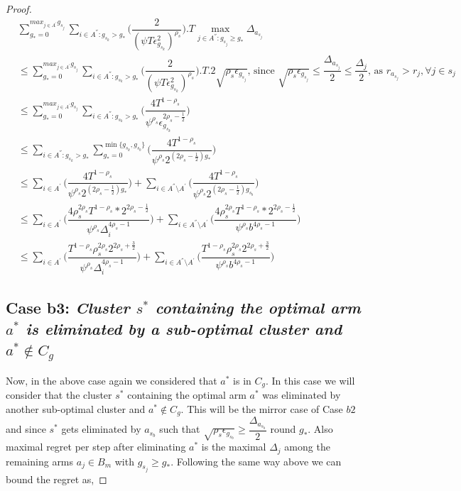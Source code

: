 \begin{proof}
\begin{align*}
 & \sum_{g_{*}=0}^{max_{j\in A^{'}}g_{s_{j}}}\sum_{i\in A^{''}:g_{s_{k}}>g_{*}}\bigg(\dfrac{2}{(\psi T\epsilon_{g_{s_{k}}}^{2})^{\rho_{s}}} \bigg).T\max_{j\in A^{''}:g_{s_{j}}\geq g_{*}}{\Delta}_{a_{s_{j}}}\\
 &\leq\sum_{g_{*}=0}^{max_{j\in A^{'}}g_{s_{j}}}\sum_{i\in A^{''}:g_{s_{k}}>g_{*}}\bigg(\dfrac{2}{(\psi T\epsilon_{g_{s_{k}}}^{2})^{\rho_{s}}} \bigg).T.2\sqrt{\rho_{s}\epsilon_{g_{s_{j}}}} \text{, since }\sqrt{\rho_{s}\epsilon_{g_{s_{j}}}}\leq\dfrac{\Delta_{a_{s_{j}}}}{2}\leq  \dfrac{\Delta_{j}}{2}\text{, as }{r}_{a_{s_{j}}}>{r}_{j},\forall j\in s_{j}\\
 &\leq\sum_{g_{*}=0}^{max_{j\in A^{'}}g_{s_{j}}}\sum_{i\in A^{''}:g_{s_{k}}>g_{*}}\bigg(\dfrac{4T^{1-\rho_{s}}}{\psi^{\rho_{s}}\epsilon_{g_{s_{k}}}^{2\rho_{s} - \frac{1}{2}}} \bigg)\\
 &\leq\sum_{i\in A^{''}:g_{s_{k}}>g_{*}}\sum_{g_{*}=0}^{\min{\lbrace g_{s_{k}},g_{s_{b}}\rbrace}}\bigg(\dfrac{4T^{1-\rho_{s}}}{\psi^{\rho_{s}}2^{({2\rho_{s} - \frac{1}{2}})g_{*}}} \bigg) \\
 &\leq\sum_{i\in A^{'}}\bigg(\dfrac{4T^{1-\rho_{s}}}{\psi^{\rho_{s}}2^{({2\rho_{s} - \frac{1}{2}})g_{*}}} \bigg)+\sum_{i\in A^{''}\setminus A^{'}}\bigg(\dfrac{4T^{1-\rho_{s}}}{\psi^{\rho_{s}}2^{({2\rho_{s} - \frac{1}{2}})g_{s_{b}}}} \bigg)\\ 
 &\leq\sum_{i\in A^{'}}\bigg(\dfrac{4\rho_{s}^{2\rho_{s}}T^{1-\rho_{s}}*2^{2\rho_{s}-\frac{1}{2}}}{\psi^{\rho_{s}}\Delta_{i}^{4\rho_{s}-1}} \bigg)+\sum_{i\in A^{''}\setminus A^{'}}\bigg(\dfrac{4\rho_{s}^{2\rho_{s}}T^{1-\rho_{s}}*2^{2\rho_{s}-\frac{1}{2}}}{\psi^{\rho_{s}}b^{4\rho_{s}-1}} \bigg)\\
 &\leq\sum_{i\in A^{'}}\bigg(\dfrac{T^{1-\rho_{s}}\rho_{s}^{2\rho_{s}}2^{2\rho_{s}+\frac{3}{2}}}{\psi^{\rho_{s}}\Delta_{i}^{4\rho_{s}-1}} \bigg)+\sum_{i\in A^{''}\setminus A^{'}}\bigg(\dfrac{T^{1-\rho_{s}}\rho_{s}^{2\rho_{s}}2^{2\rho_{s}+\frac{3}{2}}}{\psi^{\rho_{s}}b^{4\rho_{s}-1}} \bigg)
\end{align*}


\subsection*{Case b3: \textit{Cluster $s^{*}$ containing the optimal arm $a^{*}$ is eliminated by a sub-optimal cluster and $a^{*}\notin C_{g}$}}
 
	Now, in the above case again we considered that $a^{*}$ is in $C_{g}$. In this case we will consider that the cluster $s^{*}$ containing the optimal arm $a^{*}$ was eliminated by another sub-optimal cluster and $a^{*}\notin C_{g}$. This will be the mirror case of Case $b2$ and since $s^{*}$ gets eliminated by $a_{s_{b}}$ such that $\sqrt{\rho_{s}\epsilon_{g_{s_{b}}}}\geq\dfrac{\Delta_{a_{s_{b}}}}{2}$ round $g_{*}$. Also maximal regret per step after eliminating $a^{*}$ is the maximal $\Delta_{j}$ among the remaining arms $a_{j}\in B_{m}$ with $g_{s_{j}}\geq g_{*}$. Following the same way above we can bound the regret as,
 

\end{proof}
